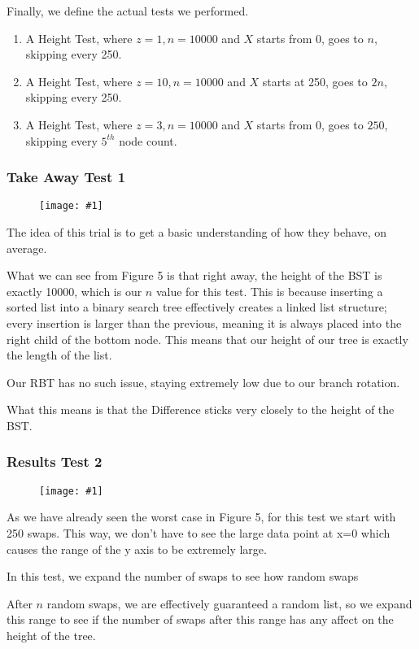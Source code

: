 \documentclass{article}
\newcommand{\figureInsetScaled}[3]
{
    \FloatBarrier{}
    \figureRaw{#1}{#2}{#3}
    \FloatBarrier{}
}
\newcommand{\figureRaw}[3]
{
    \begin{figure}[ht!]
        \centering
        \texttt{[image: \#1]}
        \caption{#2}
    \end{figure}
}
\begin{document}
Finally, we define the actual tests we performed.
\begin{enumerate}
    \item A Height Test, where $z=1, n=10000$ and $X$ starts from 0, goes to $n$, skipping every 250.
    
    \item A Height Test, where $z=10, n=10000$ and $X$ starts at 250, goes to $2n$, skipping every 250.

    \item A Height Test, where $z=3, n=10000$ and $X$ starts from 0, goes to $250$, skipping every $5^{th}$ node count.
\end{enumerate}

\subsubsection{Take Away Test 1}
\figureInsetScaled{images/experiment2/Figure_1.png}{}{0.5}

The idea of this trial is to get a basic understanding of how they behave, on average.

What we can see from Figure 5 is that right away, the height of the BST is exactly 10000, which is our $n$ value for this test. This is because inserting a sorted list into a binary search tree effectively creates a linked list structure; every insertion is larger than the previous, meaning it is always placed into the right child of the bottom node. This means that our height of our tree is exactly the length of the list.

Our RBT has no such issue, staying extremely low due to our branch rotation.

What this means is that the Difference sticks very closely to the height of the BST.

\subsubsection{Results Test 2}
\figureInsetScaled{images/experiment2/Figure_2.png}{}{0.5}

As we have already seen the worst case in Figure 5, for this test we start with 250 swaps. This way, we don't have to see the large data point at x=0 which causes the range of the y axis to be extremely large.

In this test, we expand the number of swaps to see how random swaps 

After $n$ random swaps, we are effectively guaranteed a random list, so we expand this range to see if the number of swaps after this range has any affect on the height of the tree.
\end{document}
